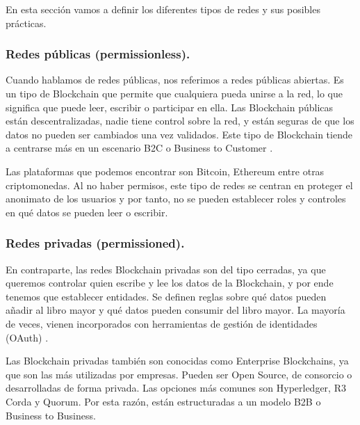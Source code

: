 \vspace{5mm}

\noindent En esta sección vamos a definir los diferentes tipos de redes y sus posibles prácticas.

\subsubsection*{Redes públicas (permissionless).}

Cuando hablamos de redes públicas, nos referimos a redes públicas abiertas. Es un tipo de Blockchain que permite que 
cualquiera pueda unirse a la red, lo que significa que puede leer, escribir o participar en ella. Las Blockchain 
públicas están descentralizadas, nadie tiene control sobre la red, y están seguras de que los datos no pueden ser 
cambiados una vez validados. Este tipo de Blockchain tiende a centrarse más en un escenario B2C o Business to Customer 
\cite{public-private-blockchain}.

\vspace{5mm}

\noindent Las plataformas que podemos encontrar son Bitcoin, Ethereum entre otras criptomonedas. Al no haber permisos,
este tipo de redes se centran en proteger el anonimato de los usuarios y por tanto, no se pueden establecer roles y
controles en qué datos se pueden leer o escribir.

\subsubsection*{Redes privadas (permissioned).}

En contraparte, las redes Blockchain privadas son del tipo cerradas, ya que queremos controlar quien escribe y lee los 
datos de la Blockchain, y por ende tenemos que establecer entidades. Se definen reglas sobre qué datos pueden añadir al 
libro mayor y qué datos pueden consumir del libro mayor. La mayoría de veces, vienen incorporados con herramientas de 
gestión de identidades (OAuth) \cite{public-private-blockchain}. 

\vspace{5mm}

\noindent Las Blockchain privadas también son conocidas como Enterprise Blockchains, ya que son las más utilizadas por 
empresas. Pueden ser Open Source, de consorcio o desarrolladas de forma privada. Las opciones más comunes son 
Hyperledger, R3 Corda y Quorum. Por esta razón, están estructuradas a un modelo B2B o Business to Business. 

